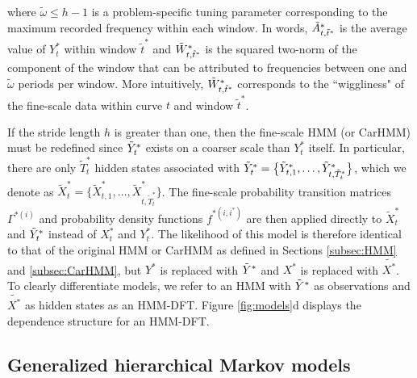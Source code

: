 %
where $\tilde{\omega} \leq h-1$ is a problem-specific tuning parameter corresponding to the maximum recorded frequency within each window. In words, $\tilde{A}^*_{t,\tilde{t}^*}$ is the average value of $Y^*_t$ within window $\tilde{t}^*$ and $\tilde{W}^*_{t,\tilde{t}^*}$ is the squared two-norm of the component of the window that can be attributed to frequencies between one and $\tilde{\omega}$ periods per window. %
More intuitively, $\tilde{W}^*_{t,\tilde{t}^*}$ corresponds to the ``wiggliness" of the fine-scale data within curve $t$ and window $\tilde{t}^*$.

If the stride length $h$ is greater than one, then the fine-scale HMM (or CarHMM) must be redefined since $\tilde{Y}^*_t$ exists on a coarser scale than $Y^*_t$ itself. In particular, there are only $\tilde{T}_t^*$ hidden states associated with $\tilde{Y}^*_t = \big\{\tilde{Y}^*_{t,1},\ldots, \tilde{Y}^*_{t,\tilde{T}^*_t}\big\}$, which we denote as $\tilde{X}^*_t = \big\{\tilde{X}^*_{t,1},\ldots, \tilde{X}^*_{t,\tilde{T}^*_t}\big\}$. The fine-scale probability transition matrices  $\Gamma^{*(i)}$ and probability density functions $f^{*(i,i^*)}$ are then applied directly to $\tilde{X}^*_t$ and $\tilde{Y}^*_t$ instead of $X^*_t$ and $Y^*_t$. The likelihood of this model is therefore identical to that of the original HMM or CarHMM as defined in Sections \ref{subsec:HMM} and \ref{subsec:CarHMM}, but $Y^*$ is replaced with $\tilde{Y}^*$ and $X^*$ is replaced with $\tilde{X^*}$. To clearly differentiate models, we refer to an HMM with $\tilde{Y}^*$ as observations and $\tilde{X^*}$ as hidden states as an HMM-DFT. Figure \ref{fig:models}d displays the dependence structure for an HMM-DFT.

\subsection{Generalized hierarchical Markov models}

